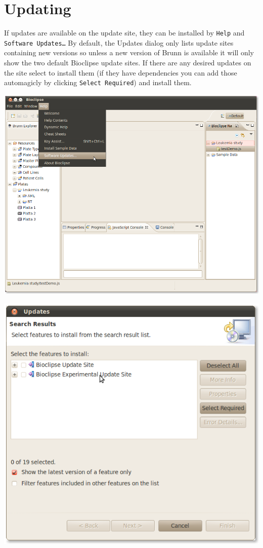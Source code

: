 \documentclass[12pt, a4paper, twoside, openany]{article}
\begin{document}
    \newpage

    \section{Updating}
    If updates are available on the update site, they can be installed by
    \texttt{Help} and \texttt{Software Updates\ldots} By default, the Updates
    dialog only lists update sites containing new versions so unless a new
    version of Brunn is available it will only show the two default Bioclipse
    update sites. If there are any desired updates on the site select to
    install them (if they have dependencies you can add those automagicly by
    clicking \texttt{Select Required}) and install them.

    \begin{center}
        \includegraphics[scale=1.2]{images/softwareUpdates.png}
    \end{center}

    \begin{center}
        \includegraphics[scale=1.2]{images/Updates.png}
    \end{center}
\end{document}
